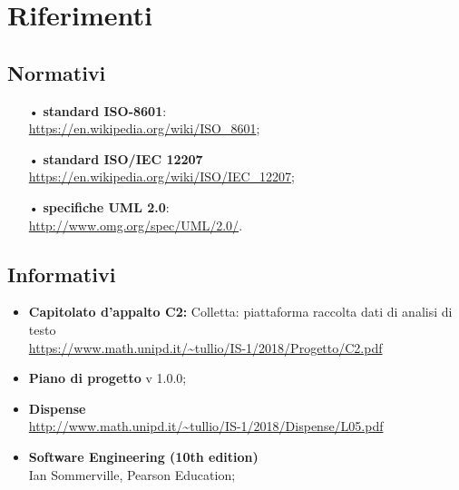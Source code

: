 \section{Riferimenti}

\subsection{Normativi}
\begin{itemize}
\item[•]\textbf{standard {ISO}-8601}:\\
\url{https://en.wikipedia.org/wiki/ISO_8601};
\item[•]\textbf{standard ISO/{IEC} 12207}\\
\url{https://en.wikipedia.org/wiki/ISO/IEC_12207};
\item[•]\textbf{specifiche {UML} 2.0}:\\
\url{http://www.omg.org/spec/UML/2.0/}.

\end{itemize} 
\subsection{Informativi}
\begin{itemize}
\item \textbf{Capitolato d’appalto C2:} Colletta: piattaforma raccolta dati di analisi di testo\\
\url{https://www.math.unipd.it/~tullio/IS-1/2018/Progetto/C2.pdf}
\item \textbf{Piano di progetto} v 1.0.0;
\item \textbf{Dispense} \\
\url{http://www.math.unipd.it/~tullio/IS-1/2018/Dispense/L05.pdf}
\item \textbf{Software Engineering (10th edition)}\\ Ian Sommerville, Pearson Education;

\end{itemize}

